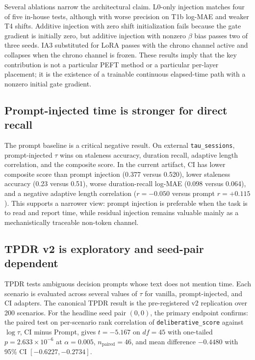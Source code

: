 \documentclass[conference,10pt]{IEEEtran}
\newcommand{\CI}{\textsc{CI}}
\newcommand{\Tau}{\tau}
\begin{document}
Several ablations narrow the architectural claim. L0-only injection matches four of five in-house tests, although with worse precision on T1b log-MAE and weaker T4 shifts. Additive injection with zero shift initialization fails because the gate gradient is initially zero, but additive injection with nonzero $\beta$ bias passes two of three seeds. IA3 substituted for LoRA passes with the chrono channel active and collapses when the chrono channel is frozen. These results imply that the key contribution is not a particular PEFT method or a particular per-layer placement; it is the existence of a trainable continuous elapsed-time path with a nonzero initial gate gradient.

\subsection{Prompt-injected time is stronger for direct recall}

The prompt baseline is a critical negative result. On external \texttt{tau\_sessions}, prompt-injected $\Tau$ wins on staleness accuracy, duration recall, adaptive length correlation, and the composite score. In the current artifact, \CI{} has lower composite score than prompt injection (0.377 versus 0.520), lower staleness accuracy (0.23 versus 0.51), worse duration-recall log-MAE (0.098 versus 0.064), and a negative adaptive length correlation ($r=-0.050$ versus prompt $r=+0.115$). This supports a narrower view: prompt injection is preferable when the task is to read and report time, while residual injection remains valuable mainly as a mechanistically traceable non-token channel.

\subsection{TPDR v2 is exploratory and seed-pair dependent}

TPDR tests ambiguous decision prompts whose text does not mention time. Each scenario is evaluated across several values of $\Tau$ for vanilla, prompt-injected, and \CI{} adapters. The canonical TPDR result is the pre-registered v2 replication over 200 scenarios. For the headline seed pair $(0,0)$, the primary endpoint confirms: the paired test on per-scenario rank correlation of \texttt{deliberative\_score} against $\log\Tau$, \CI{} minus Prompt, gives $t=-5.167$ on $df=45$ with one-tailed $p=2.633\times10^{-6}$ at $\alpha=0.005$, $n_{\text{paired}}=46$, and mean difference $-0.4480$ with 95\% CI $[-0.6227,-0.2734]$.
\end{document}
